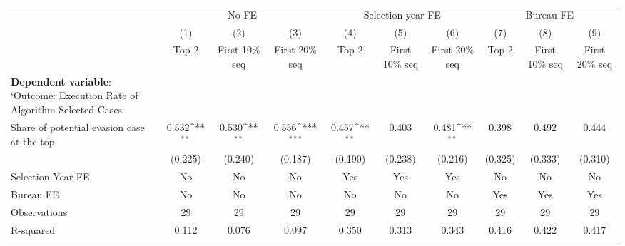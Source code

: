 {
\def\sym#1{\ifmmode^{#1}\else\(^{#1}\)\fi}
\begin{tabular}{l*{9}{c}}
\toprule
            &\multicolumn{3}{c}{No FE}                                        &\multicolumn{3}{c}{Selection year FE}                            &\multicolumn{3}{c}{Bureau FE}                                    \\\cmidrule(lr){2-4}\cmidrule(lr){5-7}\cmidrule(lr){8-10}
            &\multicolumn{1}{c}{(1)}&\multicolumn{1}{c}{(2)}&\multicolumn{1}{c}{(3)}&\multicolumn{1}{c}{(4)}&\multicolumn{1}{c}{(5)}&\multicolumn{1}{c}{(6)}&\multicolumn{1}{c}{(7)}&\multicolumn{1}{c}{(8)}&\multicolumn{1}{c}{(9)}\\
            &\multicolumn{1}{c}{Top 2}&\multicolumn{1}{c}{First 10\% seq}&\multicolumn{1}{c}{First 20\% seq}&\multicolumn{1}{c}{Top 2}&\multicolumn{1}{c}{First 10\% seq}&\multicolumn{1}{c}{First 20\% seq}&\multicolumn{1}{c}{Top 2}&\multicolumn{1}{c}{First 10\% seq}&\multicolumn{1}{c}{First 20\% seq}\\
\midrule
\textbf{Dependent variable}: `Outcome: Execution Rate of Algorithm-Selected Cases&                     &                     &                     &                     &                     &                     &                     &                     &                     \\
\addlinespace
Share of potential evasion case at the top&       0.532\sym{**} &       0.530\sym{**} &       0.556\sym{***}&       0.457\sym{**} &       0.403         &       0.481\sym{**} &       0.398         &       0.492         &       0.444         \\
            &     (0.225)         &     (0.240)         &     (0.187)         &     (0.190)         &     (0.238)         &     (0.216)         &     (0.325)         &     (0.333)         &     (0.310)         \\
\midrule
Selection Year FE&          No         &          No         &          No         &         Yes         &         Yes         &         Yes         &          No         &          No         &          No         \\
Bureau FE   &          No         &          No         &          No         &          No         &          No         &          No         &         Yes         &         Yes         &         Yes         \\
Observations&          29         &          29         &          29         &          29         &          29         &          29         &          29         &          29         &          29         \\
R-squared   &       0.112         &       0.076         &       0.097         &       0.350         &       0.313         &       0.343         &       0.416         &       0.422         &       0.417         \\
\bottomrule
\end{tabular}
}
